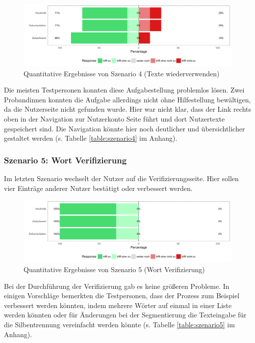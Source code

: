 \begin{figure}[h!]
	\centering
	\includegraphics[width=.8\linewidth]{figures/evaluation/scenario4}
	\caption{Quantitative Ergebnisse von Szenario 4 (Texte wiederverwenden)}
	\label{fig:evaluation-sc4}
\end{figure}

Die meisten Testpersonen konnten diese Aufgabestellung problemlos lösen. Zwei Probandinnen konnten die Aufgabe allerdings nicht ohne Hilfestellung bewältigen, da die Nutzerseite nicht gefunden wurde. Hier war nicht klar, dass der Link rechts oben in der Navigation zur Nutzerkonto Seite führt und dort Nutzertexte gespeichert sind. Die Navigation könnte hier noch deutlicher und übersichtlicher gestaltet werden (s. Tabelle \ref{table:szenario4} im Anhang).

\subsubsection{Szenario 5: Wort Verifizierung}

Im letzten Szenario wechselt der Nutzer auf die Verifizierungsseite. Hier sollen vier Einträge anderer Nutzer bestätigt oder verbessert werden.

\begin{figure}[h!]
	\centering
	\includegraphics[width=.8\linewidth]{figures/evaluation/scenario5}
	\caption{Quantitative Ergebnisse von Szenario 5 (Wort Verifizierung)}
	\label{fig:evaluation-sc5}
\end{figure}

Bei der Durchführung der Verifizierung gab es keine größeren Probleme. In einigen Vorschläge bemerkten die Testpersonen, dass der Prozess zum Beispiel verbessert werden könnten, indem mehrere Wörter auf einmal in einer Liste  werden könnten oder für Änderungen bei der Segmentierung die Texteingabe für die Silbentrennung vereinfacht werden könnte (s. Tabelle \ref{table:szenario5} im Anhang).

